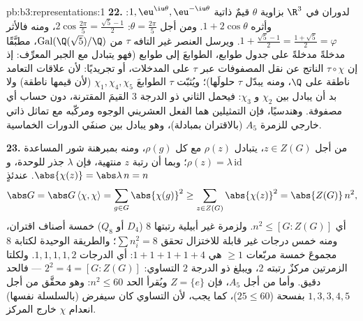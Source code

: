 \begin{solution}{pb:b3:representations:1}
\textbf{22.} لدوران في $\R^3$ بزاوية $\theta$ قيمٌ ذاتية
$1, \eu^{\iu\theta}, \eu^{-\iu\theta}$: وأثره $1 +
2\cos\theta$. ومن أجل $\theta = \frac{2\pi}5$: $2\cos\frac{2\pi}5
= \frac{\sqrt5 - 1}2$، ومنه فالأثر
$1 + \frac{\sqrt5-1}2 =
\frac{1+\sqrt5}2 = \varphi$. ويرسل العنصر غير التافه $\tau$ من $\operatorname{Gal}(\Q(\sqrt5)/\Q)$، مطبَّقًا
مدخلةً مدخلةً على جدول طوابع، الطوابعَ إلى طوابع (فهو يتبادل مع
الجبر المعرِّف: إذ إن $\tau\circ\chi$   الناتج عن نقل
المصفوفات عبر $\tau$ على المدخلات، أو تجريديًا: لأن علاقات
التعامد ناطقة على $\Q$، ومنه يبدّل $\tau$ حلولَها)؛ ويُثبّت
$\tau$ الطوابعَ $\chi_1, \chi_4, \chi_5$ (لأن قيمها ناطقة) ولا بد أن يبادل بين
$\chi_2$ و $\chi_3$: فيحمل  الثاني ذو الدرجة $3$ القيمَ
المقترنة، دون حساب أي مصفوفة. وهندسيًا، فإن التمثيلين هما الفعل
العشريني الوجوه ومركّبه مع تماثل ذاتي خارجي للزمرة $A_5$
(بالاقتران بمبادلة)، وهو يبادل بين صنفَي الدورات الخماسية.

\textbf{23.} من أجل $z \in Z(G)$، يتبادل $\rho(z)$ مع كل
$\rho(g)$، ومنه بمبرهنة شور المساعدة $\rho(z) = \lambda\,
\mathrm{id}$؛ وبما أن رتبة $z$
منتهية، فإن $\lambda$ جذر للوحدة، و $\abs{\chi(z)} = \abs\lambda\,n = n$. عندئذٍ
\[
\abs G = \abs G\,\langle\chi, \chi\rangle
= \sum_{g \in G}\abs{\chi(g)}^2
\geq \sum_{z \in Z(G)}\abs{\chi(z)}^2
= \abs{Z(G)}\,n^2,
\]
أي $n^2 \leq [G : Z(G)]$. ولزمرة غير أبيلية رتبتها $8$ ($D_4$ أو $Q_8$) خمسة
أصناف اقتران، ومنه خمس درجات غير قابلة للاختزال تحقق
$\sum n_i^2 = 8$؛ والطريقة الوحيدة لكتابة $8$ مجموعَ خمسة
مربّعات $\geq 1$ هي $1 + 1 + 1 + 1
+ 4$: أي الدرجات $1, 1, 1, 1, 2$.
ولكلتا الزمرتين مركزٌ رتبته $2$، ويبلغ  ذو الدرجة $2$
التساوي: $2^2 = 4 = [G : Z(G)]$ --- فالحد دقيق. وأما من أجل $A_5$، فإن
$Z = \{e\}$ ويُقرأ الحد $n^2 \leq 60$: وهو محقَّق من أجل
$1, 3, 3, 4, 5$ بفسحة ($25 \leq 60$)، كما يجب، لأن التساوي كان
سيفرض (بالسلسلة نفسها) انعدام $\chi$ خارج المركز.


\end{solution}
